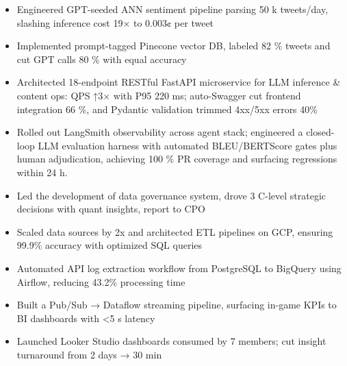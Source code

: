 \documentclass{resume}
\begin{document}
\begin{itemize}
  \item Engineered GPT-seeded ANN sentiment pipeline parsing 50 k tweets/day, slashing inference cost 19× to 0.003¢ per tweet
  \item Implemented prompt-tagged Pinecone vector DB, labeled 82 \% tweets and cut GPT calls 80 \% with equal accuracy
  \item Architected 18-endpoint RESTful FastAPI microservice for LLM inference \& content ops: QPS ↑3× with P95 220 ms; auto-Swagger cut frontend integration 66 \%, and Pydantic validation trimmed 4xx/5xx errors 40\%
  \item Rolled out LangSmith observability across agent stack; engineered a closed-loop LLM evaluation harness with automated BLEU/BERTScore gates plus human adjudication, achieving 100 \% PR coverage and surfacing regressions within 24 h.


\end{itemize}





\begin{itemize}
  \item Led the development of data governance system, drove 3 C-level strategic decisions with quant insights, report to CPO
  \item Scaled data sources by 2x and architected ETL pipelines on GCP, ensuring 99.9\% accuracy with optimized SQL queries  
  \item Automated API log extraction workflow from PostgreSQL to BigQuery using Airflow, reducing 43.2\% processing time
  \item Built a Pub/Sub → Dataflow streaming pipeline, surfacing in-game KPIs to BI dashboards with <5 s latency
  \item Launched Looker Studio dashboards consumed by 7 members; cut insight turnaround from 2 days → 30 min



\end{itemize}
\end{document}
